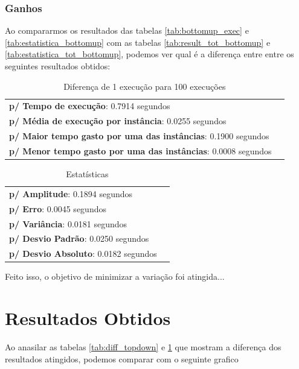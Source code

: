 \documentclass[a4paper, 12pt]{article}
\begin{document}
\subsubsection{Ganhos}

Ao compararmos os resultados das tabelas \ref{tab:bottomup_exec} e \ref{tab:estatistica_bottomup} com as 
tabelas \ref{tab:result_tot_bottomup} e \ref{tab:estatistica_tot_bottomup}, podemos ver qual é a diferença entre 
entre os seguintes resultados obtidos:
\begin{table}[!htb]
    \begin{tabular}{ll}
        {\bf p/ Tempo de execução}: 0.7914 segundos\\
        {\bf p/ Média de execução por instância}: 0.0255 segundos\\
        {\bf p/ Maior tempo gasto por uma das instâncias}: 0.1900 segundos\\
        {\bf p/ Menor tempo gasto por uma das instâncias}: 0.0008 segundos \\
    \end{tabular}
    \caption{Diferença de 1 execução para 100 execuções}
    \label{tab:diff_bottomup}
\end{table}


\begin{table}[!htb]
    \begin{tabular}{ll}
        {\bf p/ Amplitude}: 0.1894 segundos\\
        {\bf p/ Erro}: 0.0045 segundos\\
        {\bf p/ Variância}: 0.0181 segundos\\
        {\bf p/ Desvio Padrão}: 0.0250 segundos\\
        {\bf p/ Desvio Absoluto}: 0.0182 segundos
    \end{tabular}
    \caption{Estatísticas}
    \label{tab:diff_estatistica_bottomup}
\end{table}

\noindent
Feito isso, o objetivo de minimizar a variação foi atingida...

\newpage

\section{Resultados Obtidos}
Ao anasilar as tabelas \ref{tab:diff_topdown} e \ref{tab:diff_bottomup} que mostram a diferença dos resultados
atingidos, podemos comparar com o seguinte grafico
\end{document}

